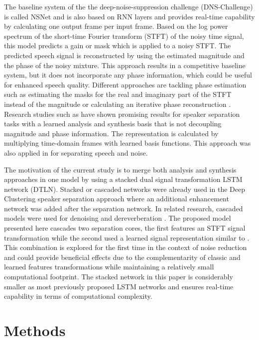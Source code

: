\documentclass[a4paper]{article}
\begin{document}
The baseline system of the the deep-noise-suppression challenge (DNS-Challenge) \cite{DNSChallenge2020} is called NSNet \cite{9054254} and is also based on RNN layers and provides real-time capability by calculating one output frame per input frame. 
Based on the log power spectrum of the short-time Fourier transform (STFT) of the noisy time signal, this model predicts a gain or mask which is applied to a noisy STFT. 
The predicted speech signal is reconstructed by using the estimated magnitude and the phase of the noisy mixture. 
This approach results in a competitive baseline system, but it does not incorporate any phase information, which could be useful for enhanced speech quality.
Different approaches are tackling phase estimation such as estimating the masks for the real and imaginary part of the STFT instead of the magnitude \cite{williamson2015complex} or calculating an iterative phase reconstruction \cite{wang2018end}. 
Research studies such as \cite{luo2018tasnet, luo2019conv, maciejewski2020whamr}  have shown promising results for speaker separation tasks with a learned analysis and synthesis basis that is not decoupling magnitude and phase information. 
The representation is calculated by multiplying time-domain frames with learned basis functions. This approach was also applied in \cite{kavalerov2019universal} for  separating speech and noise. 

The motivation of the current study is to merge both analysis and synthesis approaches in one model by using a stacked dual signal transformation LSTM network (DTLN). Stacked or cascaded networks were already used in the Deep Clustering speaker separation approach \cite{isik2016single} where an additional enhancement network was added after the separation network. 
In related research, cascaded models were used for denoising and dereverberation \cite{maciejewski2020whamr}. 
The proposed model presented here cascades two separation cores, the first features an STFT signal transformation while the second used a learned signal representation similar to \cite{luo2019conv}. 
This combination is explored for the first time in the context of noise reduction and could provide beneficial effects due to the complementarity of classic and learned features transformations while maintaining a relatively small computational footprint. 
The stacked network in this paper is considerably smaller as most previously proposed LSTM networks and ensures real-time capability in terms of computational complexity. 

\section{Methods}
\end{document}
